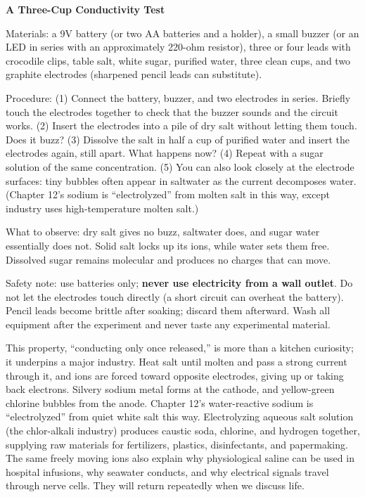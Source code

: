 \begin{shiyan}
\textbf{A Three-Cup Conductivity Test}

Materials: a 9V battery (or two AA batteries and a holder), a small buzzer (or an LED in series with an approximately 220-ohm resistor), three or four leads with crocodile clips, table salt, white sugar, purified water, three clean cups, and two graphite electrodes (sharpened pencil leads can substitute).

Procedure: (1) Connect the battery, buzzer, and two electrodes in series. Briefly touch the electrodes together to check that the buzzer sounds and the circuit works. (2) Insert the electrodes into a pile of dry salt without letting them touch. Does it buzz? (3) Dissolve the salt in half a cup of purified water and insert the electrodes again, still apart. What happens now? (4) Repeat with a sugar solution of the same concentration. (5) You can also look closely at the electrode surfaces: tiny bubbles often appear in saltwater as the current decomposes water. (Chapter 12's sodium is ``electrolyzed'' from molten salt in this way, except industry uses high-temperature molten salt.)

What to observe: dry salt gives no buzz, saltwater does, and sugar water essentially does not. Solid salt locks up its ions, while water sets them free. Dissolved sugar remains molecular and produces no charges that can move.

Safety note: use batteries only; \textbf{never use electricity from a wall outlet}. Do not let the electrodes touch directly (a short circuit can overheat the battery). Pencil leads become brittle after soaking; discard them afterward. Wash all equipment after the experiment and never taste any experimental material.
\end{shiyan}

This property, ``conducting only once released,'' is more than a kitchen curiosity; it underpins a major industry. Heat salt until molten and pass a strong current through it, and ions are forced toward opposite electrodes, giving up or taking back electrons. Silvery sodium metal forms at the cathode, and yellow-green chlorine bubbles from the anode. Chapter 12's water-reactive sodium is ``electrolyzed'' from quiet white salt this way. Electrolyzing aqueous salt solution (the chlor-alkali industry) produces caustic soda, chlorine, and hydrogen together, supplying raw materials for fertilizers, plastics, disinfectants, and papermaking. The same freely moving ions also explain why physiological saline can be used in hospital infusions, why seawater conducts, and why electrical signals travel through nerve cells. They will return repeatedly when we discuss life.

